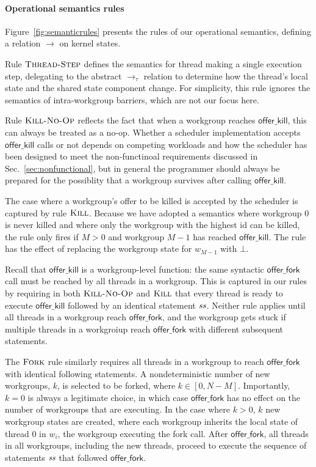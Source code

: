 \documentclass[numbers,nocopyrightspace,10pt]{sigplanconf}
\newcommand{\myfiglong}{Figure~}
\newcommand{\mysec}{Sec.~}
\newcommand{\offerfork}{\mathsf{offer\_fork}}
\newcommand{\offerkill}{\mathsf{offer\_kill}}
\begin{document}
\paragraph{Operational semantics rules}

\myfiglong\ref{fig:semanticrules} presents the rules of our
operational semantics, defining a relation $\rightarrow$ on kernel
states.

Rule $\textsc{Thread-Step}$ defines the semantics for thread making a
single execution step, delegating to the abstract $\rightarrow_{\tau}$
relation to determine how the thread's local state and the shared
state component change.  For simplicity, this rule ignores the
semantics of intra-workgroup barriers, which are not our focus here.

Rule $\textsc{Kill-No-Op}$ reflects the fact that when a workgroup
reaches $\offerkill$, this can always be treated as a no-op.  Whether
a scheduler implementation accepts $\offerkill$ calls or not depends
on competing workloads and how the scheduler has been designed to meet
the non-functinoal requirements discussed in
\mysec\ref{sec:nonfunctional}, but in general the programmer should
always be prepared for the possiblity that a workgroup survives after
calling $\offerkill$.

The case where a workgroup's offer to be killed is accepted by the
scheduler is captured by rule $\textsc{Kill}$.  Because we have
adopted a semantics where workgroup 0 is never killed and where only
the workgroup with the highest id can be killed, the rule only fires
if $M > 0$ and workgroup $M-1$ has reached $\offerkill$.  The rule has
the effect of replacing the workgroup state for $w_{M-1}$
with $\bot$.

Recall that $\offerkill$ is a workgroup-level function: the same
syntactic $\offerfork$ call must be reached by all threads in a
workgroup.  This is captured in our rules by requiring in both
$\textsc{Kill-No-Op}$ and $\textsc{Kill}$ that every thread is ready
to execute $\offerkill$ followed by an identical statement $\mathit{ss}$.
Neither rule applies until all threads in a workgroup reach
$\offerfork$, and the workgroup gets stuck if multiple threads in a
workgroiup reach $\offerfork$ with different subsequent statements.

The $\textsc{Fork}$ rule similarly requires all threads in a workgroup
to reach $\offerfork$ with identical following statements.  A
nondeterministic number of new workgroups, $k$, is selected to be
forked, where $k \in [0, N-M]$.  Importantly, $k=0$ is always a
legitimate choice, in which case $\offerfork$ has no effect on the
number of workgroups that are executing.  In the case where $k > 0$,
$k$ new workgroup states are created, where each workgroup inherits
the local state of thread 0 in $w_i$, the workgroup executing the fork
call.  After $\offerfork$, all threads in all workgroups, including
the new threads, proceed to execute the sequence of statements $\mathit{ss}$
that followed $\offerfork$.
\end{document}
